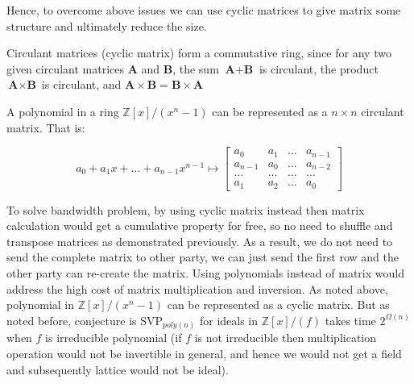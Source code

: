 Hence, to overcome above issues we can use cyclic matrices to give matrix some structure and ultimately reduce the size.

\begin{plain}
\normalfont
Circulant matrices (cyclic matrix) form a commutative ring, since for any two given circulant matrices $\textbf{A}$ and $\textbf{B}$, the sum $\textbf{A}+\textbf{B}$ is circulant, the product $\textbf{A} \times \textbf{B}$ is circulant, and $\textbf{A} \times \textbf{B}=\textbf{B} \times \textbf{A}$
\end{plain}

\begin{plain}
\normalfont
A polynomial in a ring $\mathbb{Z}[x] / (x^n-1)$ can be represented as a $n \times n$ circulant matrix. That is:

\[a_0 + a_1x + \dots + a_{n-1}x^{n-1} \mapsto \begin{bmatrix}a_0&a_1 &\dots& a_{n-1} \\a_{n-1}&a_0 &\dots & a_{n-2} \\\dots&\dots&\dots&\dots \\a_{1} & a_2 &\dots& a_0\end{bmatrix}\]
\end{plain}

To solve bandwidth problem, by using cyclic matrix instead then matrix calculation would get a cumulative property for free, so no need to shuffle and transpose matrices as demonstrated previously. As a result, we do not need to send the complete matrix to other party, we can just send the first row and the other party can re-create the matrix. Using polynomials instead of matrix would address the high cost of matrix multiplication and inversion. As noted above, polynomial in $\mathbb{Z}[x] / (x^n - 1)$ can be represented as a cyclic matrix. But as noted before, conjecture is $\mathrm{SVP}_{poly(n)}$ for ideals in $\mathbb{Z}[x]/(f)$ takes time $2^{\Omega(n)}$ when $f$ is irreducible polynomial (if $f$ is not irreducible then multiplication operation would not be invertible in general, and hence we would not get a field and subsequently lattice would not be ideal).


